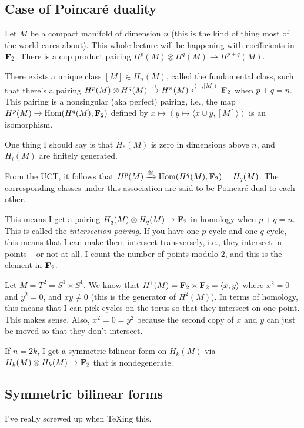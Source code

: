 \subsection{Case of Poincar\'{e} duality}
Let $M$ be a compact manifold of dimension $n$ (this is the kind of thing most of the world cares about). This whole lecture will be happening with coefficients in $\mathbf F_2$. There is a cup product pairing $ H^p(M)\otimes H^q(M)\to H^{p+q}(M)$.
\begin{theorem}
There exists a unique class $[M]\in H_n(M)$, called the fundamental class, such that there's a pairing $ H^p(M)\otimes H^q(M)\xrightarrow{\cup} H^n(M)\xleftarrow{\langle -,[M]\rangle}\mathbf F_2$ when $p+q=n$. This pairing is a nonsingular (aka perfect) pairing, i.e., the map $ H^p(M)\to\operatorname{Hom}( H^q(M),\mathbf F_2)$ defined by $x\mapsto(y\mapsto\langle x\cup y,[M]\rangle)$ is an isomorphism.
\end{theorem}
One thing I should say is that $ H_\ast(M)$ is zero in dimensions above $n$, and $ H_i(M)$ are finitely generated.
\begin{corollary}
From the UCT, it follows that $ H^p(M)\xrightarrow{\cong}\operatorname{Hom}( H^q(M),\mathbf F_2)= H_q(M)$. The corresponding classes under this association are said to be Poincar\'{e} dual to each other.
\end{corollary}
\begin{remark}
This means I get a pairing $ H_q(M)\otimes H_q(M)\to \mathbf F_2$ in homology when $p+q=n$. This is called the \emph{intersection pairing}. If you have one $p$-cycle and one $q$-cycle, this means that I can make them intersect transversely, i.e., they intersect in points -- or not at all. I count the number of points modulo $2$, and this is the element in $\mathbf F_2$.
\end{remark}
\begin{example}
Let $M=T^2=S^1\times S^1$. We know that $ H^1(M)=\mathbf F_2\times\mathbf F_2=\langle x,y\rangle$ where $x^2=0$ and $y^2=0$, and $xy\neq 0$ (this is the generator of $ H^2(M)$). In terms of homology, this means that I can pick cycles on the torus so that they intersect on one point. This makes sense. Also, $x^2=0=y^2$ because the second copy of $x$ and $y$ can just be moved so that they don't intersect.
\end{example}
\begin{example}
If $n=2k$, I get a symmetric bilinear form on $ H_k(M)$ via $ H_k(M)\otimes H_k(M)\to \mathbf F_2$ that is nondegenerate.
\end{example}
\subsection{Symmetric bilinear forms}
I've really screwed up when TeXing this.

